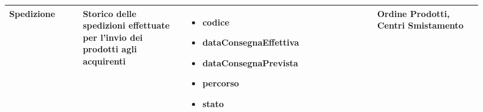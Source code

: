 \documentclass[12pt,a4paper]{article}
\begin{document}
\begin{center}
\begin{longtable}{|p{0.14\linewidth}|p{0.20\linewidth}|p{0.36\linewidth}|p{0.20\linewidth}|}
\hline
Spedizione 			&  Storico delle spedizioni effettuate per l'invio dei prodotti agli acquirenti  
					& \begin{itemize}
						\setlength{\itemindent}{-1em}
						\vspace{-25pt}
						\setlength\itemsep{-0.25em}
						\item codice
						\item dataConsegnaEffettiva
						\item dataConsegnaPrevista
						\item percorso
						\item stato
					\end{itemize}
					&  Ordine Prodotti, Centri Smistamento  \\ 

\hline


\end{longtable}
\end{center}
\pagebreak
\end{document}
